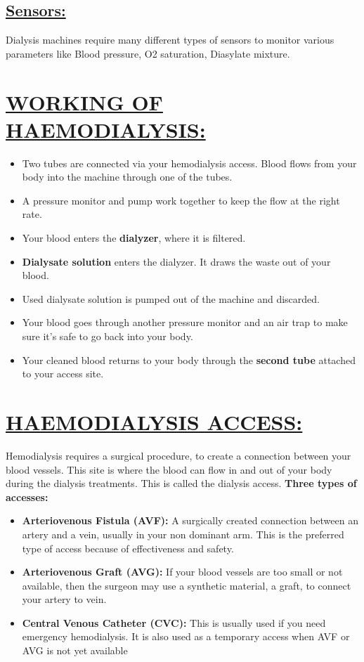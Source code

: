 \documentclass[12pt]{article}
\begin{document}
\subsection{\underline{Sensors:}}
Dialysis machines require many different types of sensors to monitor various parameters like Blood pressure, O2 saturation, Diasylate mixture.
\section{\underline{WORKING OF HAEMODIALYSIS:}}
\begin{itemize}
\item Two tubes are connected via your hemodialysis access. Blood flows from your body into the machine through one of the tubes. 
\item A pressure monitor and pump work together to keep the flow at the right rate.
\item Your blood enters the \textbf{dialyzer}, where it is filtered.
\item \textbf{Dialysate solution} enters the dialyzer. It draws the waste out of your blood.
\item Used dialysate solution is pumped out of the machine and discarded. 
\item Your blood goes through another pressure monitor and an air trap to make sure it’s safe to go back into your body.
\item Your cleaned blood returns to your body through the \textbf{second tube} attached to your access site.
\end{itemize}
\section {\underline{HAEMODIALYSIS ACCESS:}}
Hemodialysis requires a surgical procedure, to create a connection between your blood vessels. This site is where the blood can flow in and out of your body during the dialysis treatments. This is called the dialysis access.
\textbf{Three types of accesses:}
\begin{itemize}
\item \textbf{Arteriovenous Fistula (AVF):}
A surgically created connection between an artery and a vein, usually in your non dominant arm. This is the preferred type of access because of effectiveness and safety.
\item \textbf{Arteriovenous Graft (AVG):}
If your blood vessels are too small or not available, then the surgeon may use a synthetic material, a graft, to connect your artery to vein.
\item \textbf{Central Venous Catheter (CVC):}
This is usually used if you need emergency hemodialysis. It is also used as a temporary access when AVF or AVG is not yet available
\end{itemize}
\end{document}
